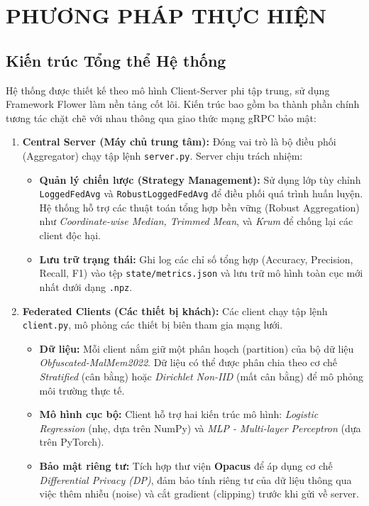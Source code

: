 \section{PHƯƠNG PHÁP THỰC HIỆN}

\subsection{Kiến trúc Tổng thể Hệ thống}

Hệ thống được thiết kế theo mô hình Client-Server phi tập trung, sử dụng Framework Flower làm nền tảng cốt lõi. Kiến trúc bao gồm ba thành phần chính tương tác chặt chẽ với nhau thông qua giao thức mạng gRPC bảo mật:

\begin{enumerate}
    \item \textbf{Central Server (Máy chủ trung tâm):}
    Đóng vai trò là bộ điều phối (Aggregator) chạy tập lệnh \texttt{server.py}. Server chịu trách nhiệm:
    \begin{itemize}
        \item \textbf{Quản lý chiến lược (Strategy Management):} Sử dụng lớp tùy chỉnh \texttt{LoggedFedAvg} và \texttt{RobustLoggedFedAvg} để điều phối quá trình huấn luyện. Hệ thống hỗ trợ các thuật toán tổng hợp bền vững (Robust Aggregation) như \textit{Coordinate-wise Median, Trimmed Mean}, và \textit{Krum} để chống lại các client độc hại.
        \item \textbf{Lưu trữ trạng thái:} Ghi log các chỉ số tổng hợp (Accuracy, Precision, Recall, F1) vào tệp \texttt{state/metrics.json} và lưu trữ mô hình toàn cục mới nhất dưới dạng \texttt{.npz}.
    \end{itemize}

    \item \textbf{Federated Clients (Các thiết bị khách):}
    Các client chạy tập lệnh \texttt{client.py}, mô phỏng các thiết bị biên tham gia mạng lưới.
    \begin{itemize}
        \item \textbf{Dữ liệu:} Mỗi client nắm giữ một phân hoạch (partition) của bộ dữ liệu \textit{Obfuscated-MalMem2022}. Dữ liệu có thể được phân chia theo cơ chế \textit{Stratified} (cân bằng) hoặc \textit{Dirichlet Non-IID} (mất cân bằng) để mô phỏng môi trường thực tế.
        \item \textbf{Mô hình cục bộ:} Client hỗ trợ hai kiến trúc mô hình: \textit{Logistic Regression} (nhẹ, dựa trên NumPy) và \textit{MLP - Multi-layer Perceptron} (dựa trên PyTorch).
        \item \textbf{Bảo mật riêng tư:} Tích hợp thư viện \textbf{Opacus} để áp dụng cơ chế \textit{Differential Privacy (DP)}, đảm bảo tính riêng tư của dữ liệu thông qua việc thêm nhiễu (noise) và cắt gradient (clipping) trước khi gửi về server.
    \end{itemize}


\end{enumerate}
